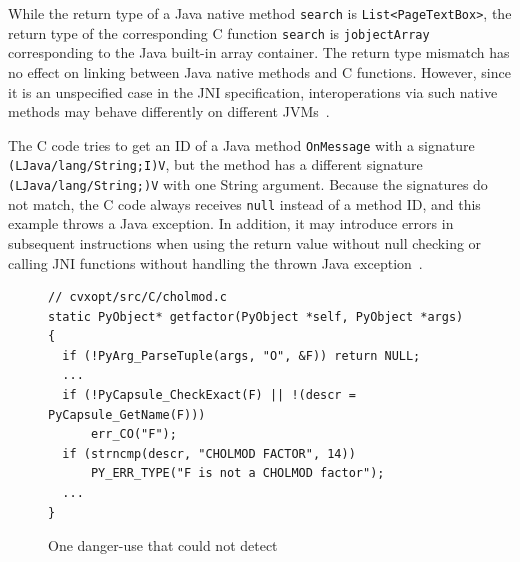 While the return type of a Java native method {\tt search}
is {\tt List<PageTextBox>}, the return type of the corresponding C function
{\tt search} is {\tt jobjectArray} corresponding to the Java built-in array
container. The return type mismatch has no effect on linking between
Java native methods and C functions. However, since it is an unspecified case in
the JNI specification, interoperations via such native methods may behave
differently on different JVMs~\cite{LeeASE20}. 


The C code tries to get an ID of a Java method {\tt OnMessage} with a
signature \texttt{(LJava/lang/String;I)V}, but the method has a different
signature \texttt{(LJava/lang/String;)V} with one String argument. Because
the signatures do not match, the C code always receives {\tt null}
instead of a method ID, and this example throws a Java exception. In
addition, it may introduce errors in subsequent instructions when using the
return value without null checking or calling JNI functions without handling the
thrown Java exception~\cite{jniexcept}.





\begin{figure}[ht!]
  \centering
  \vspace{2mm}
  \begin{lstlisting}[style=cpp,xleftmargin=2.5em]
// cvxopt/src/C/cholmod.c
static PyObject* getfactor(PyObject *self, PyObject *args)
{
  if (!PyArg_ParseTuple(args, "O", &F)) return NULL;
  ...
  if (!PyCapsule_CheckExact(F) || !(descr = PyCapsule_GetName(F)))
      err_CO("F");
  if (strncmp(descr, "CHOLMOD FACTOR", 14))
      PY_ERR_TYPE("F is not a CHOLMOD factor");
  ...
}
  \end{lstlisting}
    \vspace*{-.5em}
  \caption{One danger-use that \ours could not detect}
  \label{fig:cvxopt}
\end{figure}

